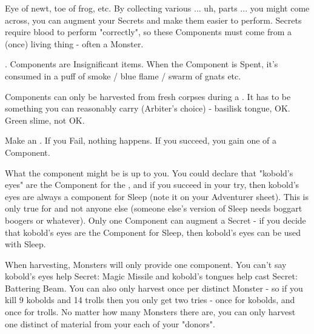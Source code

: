 
Eye of newt, toe of frog, etc. By collecting various ... uh, parts ... you might come across, you can augment your Secrets and make them easier to perform. Secrets require blood to perform "correctly", so these Components must come from a (once) living thing - often a Monster.

.  Components are Insignificant items. When the Component is Spent, it's consumed in a puff of smoke / blue flame / swarm of gnats etc.

Components can only be harvested from fresh corpses during a . It has to be something you can reasonably carry (Arbiter's choice) - basilisk tongue, OK.  Green slime, not OK. 

Make an \RSTRY{\INT}. If you Fail, nothing happens. If you succeed, you gain one  of a Component.

What the component might be is up to you. You could declare that "kobold's eyes" are the Component for the , and if you succeed in your \RS try, then kobold's eyes are always a component for Sleep (note it on your Adventurer sheet). This is only true for  and not anyone else (someone else's version of Sleep needs boggart boogers or whatever). Only one Component can augment a Secret - if you decide that kobold's eyes are the Component for Sleep, then  kobold's eyes can be used with Sleep.

When harvesting, Monsters will only provide one component. You can't say kobold's eyes help Secret: Magic Missile and kobold's tongues help cast Secret: Battering Beam. You can also only harvest once per distinct Monster - so if you kill 9 kobolds and 14 trolls then you only get two tries - once for kobolds, and once for trolls.  No matter how many Monsters there are, you can only harvest one distinct  of material from your each of your "donors".


